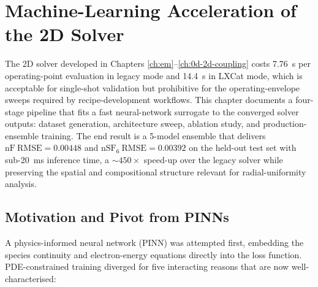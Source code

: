 
\chapter{Machine-Learning Acceleration of the 2D Solver}
\label{ch:ml-acceleration}

The 2D solver developed in Chapters \ref{ch:em}--\ref{ch:0d-2d-coupling} costs
\SI{7.76}{\second} per operating-point evaluation in legacy mode and
\SI{14.4}{\second} in LXCat mode, which is acceptable for single-shot validation
but prohibitive for the operating-envelope sweeps required by recipe-development
workflows. This chapter documents a four-stage pipeline that fits a fast
neural-network surrogate to the converged solver outputs:
dataset generation, architecture sweep, ablation study, and production-ensemble
training. The end result is a 5-model ensemble that delivers $\mathrm{nF}\
\mathrm{RMSE} = 0.00448$ and $\mathrm{nSF}_6\ \mathrm{RMSE} = 0.00392$ on the
held-out test set with sub-\SI{20}{\milli\second} inference time, a
$\sim$$450\times$ speed-up over the legacy solver while preserving the spatial
and compositional structure relevant for radial-uniformity analysis.

\section{Motivation and Pivot from PINNs}
\label{sec:ml-motivation}

A physics-informed neural network (PINN) was attempted first, embedding the
species continuity and electron-energy equations directly into the loss
function. PDE-constrained training diverged for five interacting reasons that
are now well-characterised:

